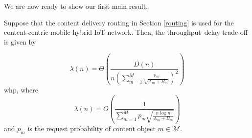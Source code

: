 \documentclass[10pt,journal,compsoc,onecolumn]{IEEEtran}
\begin{document}
We are now ready to show our first main result.

\begin{thm} \label{tradeoff}
Suppose that the content delivery routing in Section \ref{routing}
is used for the content-centric mobile hybrid IoT network. Then, the
throughput--delay trade-off is given by

\begin{equation}
\label{equa6}
\lambda(n)  = \Theta\left( \frac{D(n)}{n \left(\sum^{M}_{m=1} \frac{p_m}{\sqrt{A_m+B_m}}\right)^2}\right)
\end{equation} whp, where
\begin{equation}
\label{equa91}
\lambda(n)=O\left(\frac{1}{\sum^{M}_{m=1} p_m \sqrt{\frac{n\log n}{A_m+B_m}}}\right) \nonumber
\end{equation}
and $p_m$ is the request probability of content object $m \in \mathcal{M}$.
\end{thm}
\end{document}
